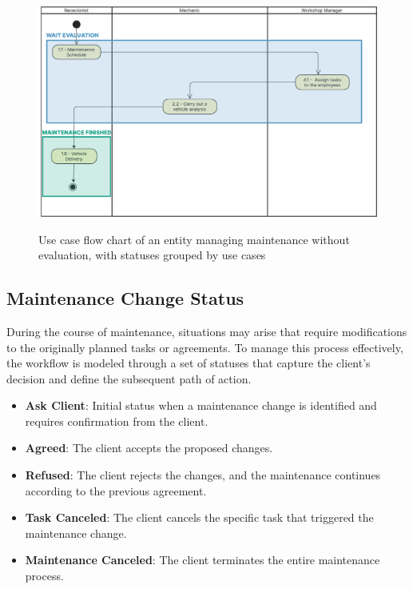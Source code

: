 \begin{figure}[h]
  \caption{Use case flow chart of an entity managing maintenance without evaluation, with statuses grouped by use cases}
  \centering
  \includegraphics[width=\textwidth]{figs/Status/Maintenance/EntityDiagram}
  \label{fig:maintenanceDealershipUseCaseStatus}
\end{figure}


\subsection{Maintenance Change Status} 

During the course of maintenance, situations may arise that require modifications to the originally planned tasks or agreements. To manage this process effectively, the workflow is modeled through a set of statuses that capture the client's decision and define the subsequent path of action. 

\begin{itemize}
    \item \textbf{Ask Client}: Initial status when a maintenance change is identified and requires confirmation from the client.
    \item \textbf{Agreed}: The client accepts the proposed changes.
    \item \textbf{Refused}: The client rejects the changes, and the maintenance continues according to the previous agreement.
    \item \textbf{Task Canceled}: The client cancels the specific task that triggered the maintenance change.
    \item \textbf{Maintenance Canceled}: The client terminates the entire maintenance process.
\end{itemize}


